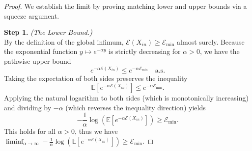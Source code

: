 \documentclass[12pt]{amsart}
\numberwithin{equation}{section}
\begin{document}
\begin{proof}
We establish the limit by proving matching lower and upper bounds via a squeeze argument.

\textbf{Step 1.} \textit{(The Lower Bound.)} \\
By the definition of the global infimum, $\mathscr{E}(X_{in}) \ge \mathscr{E}_{\min}$ almost surely. Because the exponential function $y \mapsto e^{-\alpha y}$ is strictly decreasing for $\alpha > 0$, we have the pathwise upper bound
\begin{equation*}
    e^{-\alpha \mathscr{E}(X_{in})} \le e^{-\alpha \mathscr{E}_{\min}} \quad \text{a.s.}
\end{equation*}
Taking the expectation of both sides preserves the inequality
\begin{equation*}
    \mathbb{E} \left[ e^{-\alpha \mathscr{E}(X_{in})} \right] \le e^{-\alpha \mathscr{E}_{\min}}.
\end{equation*}
Applying the natural logarithm to both sides (which is monotonically increasing) and dividing by $-\alpha$ (which reverses the inequality direction) yields
\begin{equation}\label{eq:laplace_lower_bound}
    -\frac{1}{\alpha} \log \left( \mathbb{E} \left[ e^{-\alpha \mathscr{E}(X_{in})} \right] \right) \ge \mathscr{E}_{\min}.
\end{equation}
This holds for all $\alpha > 0$, thus we have  $\liminf_{\alpha \to \infty} -\frac{1}{\alpha} \log ( \mathbb{E} [ e^{-\alpha \mathscr{E}(X_{in})} ] ) \ge \mathscr{E}_{\min}$.


\end{proof}
\end{document}

